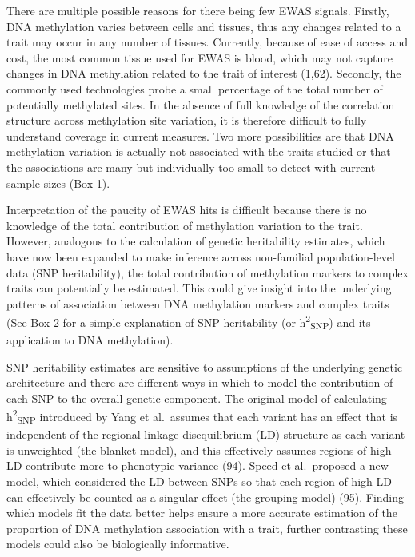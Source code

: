 \documentclass[11pt,oneside]{bristolthesis}
\begin{document}
There are multiple possible reasons for there being few EWAS signals. Firstly, DNA methylation varies between cells and tissues, thus any changes related to a trait may occur in any number of tissues. Currently, because of ease of access and cost, the most common tissue used for EWAS is blood, which may not capture changes in DNA methylation related to the trait of interest (1,62). Secondly, the commonly used technologies probe a small percentage of the total number of potentially methylated sites. In the absence of full knowledge of the correlation structure across methylation site variation, it is therefore difficult to fully understand coverage in current measures. Two more possibilities are that DNA methylation variation is actually not associated with the traits studied or that the associations are many but individually too small to detect with current sample sizes (Box 1).

Interpretation of the paucity of EWAS hits is difficult because there is no knowledge of the total contribution of methylation variation to the trait. However, analogous to the calculation of genetic heritability estimates, which have now been expanded to make inference across non-familial population-level data (SNP heritability), the total contribution of methylation markers to complex traits can potentially be estimated. This could give insight into the underlying patterns of association between DNA methylation markers and complex traits (See Box 2 for a simple explanation of SNP heritability (or h\textsuperscript{2}\textsubscript{SNP}) and its application to DNA methylation).

SNP heritability estimates are sensitive to assumptions of the underlying genetic architecture and there are different ways in which to model the contribution of each SNP to the overall genetic component. The original model of calculating h\textsuperscript{2}\textsubscript{SNP} introduced by Yang et al.~assumes that each variant has an effect that is independent of the regional linkage disequilibrium (LD) structure as each variant is unweighted (the blanket model), and this effectively assumes regions of high LD contribute more to phenotypic variance (94). Speed et al.~proposed a new model, which considered the LD between SNPs so that each region of high LD can effectively be counted as a singular effect (the grouping model) (95). Finding which models fit the data better helps ensure a more accurate estimation of the proportion of DNA methylation association with a trait, further contrasting these models could also be biologically informative.
\end{document}
